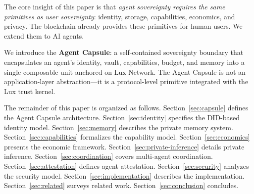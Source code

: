 The core insight of this paper is that \emph{agent sovereignty requires the same primitives as user sovereignty}: identity, storage, capabilities, economics, and privacy. The blockchain already provides these primitives for human users. We extend them to AI agents.

We introduce the \textbf{Agent Capsule}: a self-contained sovereignty boundary that encapsulates an agent's identity, vault, capabilities, budget, and memory into a single composable unit anchored on Lux Network. The Agent Capsule is not an application-layer abstraction---it is a protocol-level primitive integrated with the Lux trust kernel.

The remainder of this paper is organized as follows. Section~\ref{sec:capsule} defines the Agent Capsule architecture. Section~\ref{sec:identity} specifies the DID-based identity model. Section~\ref{sec:memory} describes the private memory system. Section~\ref{sec:capabilities} formalizes the capability model. Section~\ref{sec:economics} presents the economic framework. Section~\ref{sec:private-inference} details private inference. Section~\ref{sec:coordination} covers multi-agent coordination. Section~\ref{sec:attestation} defines agent attestation. Section~\ref{sec:security} analyzes the security model. Section~\ref{sec:implementation} describes the implementation. Section~\ref{sec:related} surveys related work. Section~\ref{sec:conclusion} concludes.

